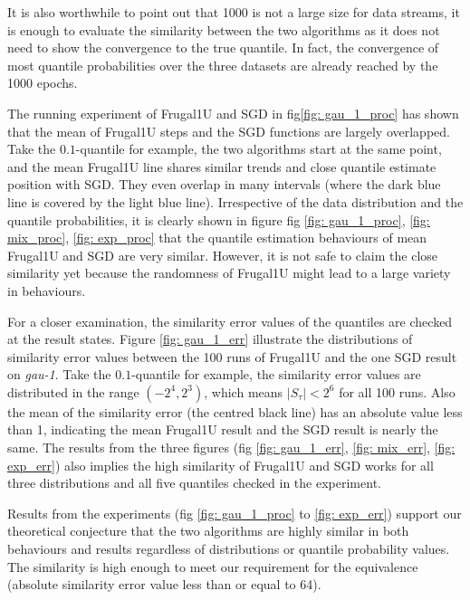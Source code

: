 It is also worthwhile to point out that 1000 is not a large size for data streams, it is enough to evaluate the similarity between the two algorithms as it does not need to show the convergence to the true quantile. In fact, the convergence of most quantile probabilities over the three datasets are already reached by the 1000 epochs.

The running experiment of Frugal1U and SGD in fig\ref{fig: gau_1_proc} has shown that the mean of Frugal1U steps and the SGD functions are largely overlapped. Take the $0.1$-quantile for example, the two algorithms start at the same point, and the mean Frugal1U line shares similar trends and close quantile estimate position with SGD. They even overlap in many intervals (where the dark blue line is covered by the light blue line).
Irrespective of the data distribution and the quantile probabilities, it is clearly shown in figure fig \ref{fig: gau_1_proc}, \ref{fig: mix_proc}, \ref{fig: exp_proc} that the quantile estimation behaviours of mean Frugal1U and SGD are very similar. However, it is not safe to claim the close similarity yet because the randomness of Frugal1U might lead to a large variety in behaviours.

For a closer examination, the similarity error values of the quantiles are checked at the result states. Figure \ref{fig: gau_1_err} illustrate the distributions of similarity error values between the 100 runs of Frugal1U and the one SGD result on \textit{gau-1}. Take the 0$.1$-quantile for example, the similarity error values are distributed in the range $(-2^4, 2^3)$, which means $|S_\tau| < 2^6$ for all 100 runs. Also the mean of the similarity error (the centred black line) has an absolute value less than 1, indicating the mean Frugal1U result and the SGD result is nearly the same. The results from the three figures (fig \ref{fig: gau_1_err}, \ref{fig: mix_err}, \ref{fig: exp_err}) also implies the high similarity of Frugal1U and SGD works for all three distributions and all five quantiles checked in the experiment.

Results from the experiments (fig \ref{fig: gau_1_proc} to \ref{fig: exp_err}) support our theoretical conjecture that the two algorithms are highly similar in both behaviours and results regardless of distributions or quantile probability values. The similarity is high enough to meet our requirement for the equivalence (absolute similarity error value less than or equal to 64).


